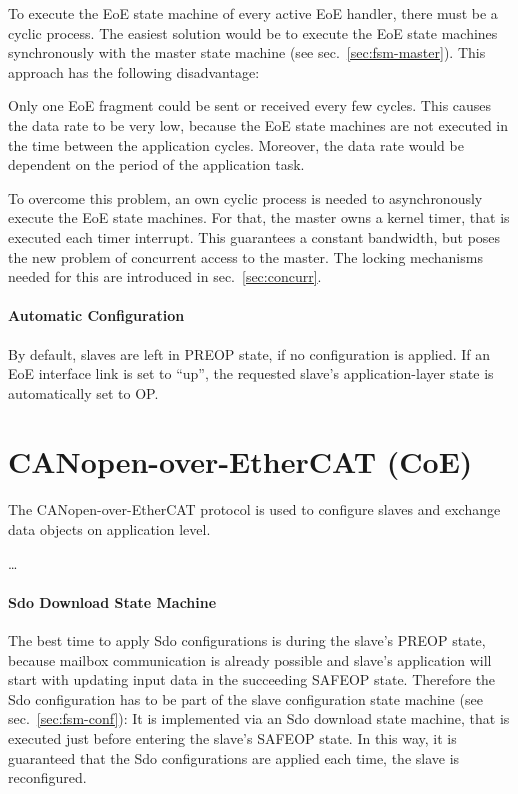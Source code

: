 \documentclass[a4paper,12pt,BCOR6mm,bibtotoc,idxtotoc]{scrbook}
\begin{document}
To execute the EoE state machine of every active EoE handler, there must be a
cyclic process. The easiest solution would be to execute the EoE state
machines synchronously with the master state machine (see
sec.~\ref{sec:fsm-master}). This approach has the following disadvantage:

Only one EoE fragment could be sent or received every few cycles. This
causes the data rate to be very low, because the EoE state machines are not
executed in the time between the application cycles. Moreover, the data rate
would be dependent on the period of the application task.

To overcome this problem, an own cyclic process is needed to asynchronously
execute the EoE state machines. For that, the master owns a kernel timer, that
is executed each timer interrupt. This guarantees a constant bandwidth, but
poses the new problem of concurrent access to the master. The locking
mechanisms needed for this are introduced in sec.~\ref{sec:concurr}.

\paragraph{Automatic Configuration}

By default, slaves are left in PREOP state, if no configuration is applied. If
an EoE interface link is set to ``up'', the requested slave's
application-layer state is automatically set to OP.


\section{CANopen-over-EtherCAT (CoE)}
\label{sec:coe}

The CANopen-over-EtherCAT protocol \cite[sec.~5.6]{alspec} is used to
configure slaves and exchange data objects on application level.

%
%

\ldots

\paragraph{Sdo Download State Machine}

The best time to apply Sdo configurations is during the slave's PREOP state,
because mailbox communication is already possible and slave's application will
start with updating input data in the succeeding SAFEOP state. Therefore the
Sdo configuration has to be part of the slave configuration state machine (see
sec.~\ref{sec:fsm-conf}): It is implemented via an Sdo download state machine,
that is executed just before entering the slave's SAFEOP state. In this way,
it is guaranteed that the Sdo configurations are applied each time, the slave
is reconfigured.
\end{document}
